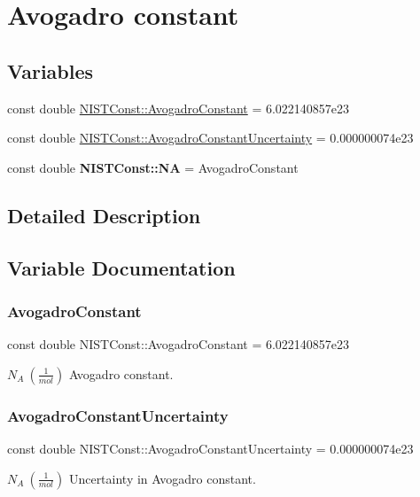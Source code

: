 \hypertarget{group___avogadro_constant}{}\section{Avogadro constant}
\label{group___avogadro_constant}
\subsection*{Variables}
\begin{DoxyCompactItemize}
\item 
const double \hyperlink{group___avogadro_constant_gad82b2a4777628c4e67a87b8f5b99174e}{N\+I\+S\+T\+Const\+::\+Avogadro\+Constant} = 6.\+022140857e23
\item 
const double \hyperlink{group___avogadro_constant_ga38f3e71e31d844bbfe2dfacf7100c4d1}{N\+I\+S\+T\+Const\+::\+Avogadro\+Constant\+Uncertainty} = 0.\+000000074e23
\item 
\mbox{\label{group___avogadro_constant_gad08af58ac1b1ee41e25bd8564a74bc42}} 
const double {\bfseries N\+I\+S\+T\+Const\+::\+NA} = Avogadro\+Constant
\end{DoxyCompactItemize}


\subsection{Detailed Description}


\subsection{Variable Documentation}
\mbox{\label{group___avogadro_constant_gad82b2a4777628c4e67a87b8f5b99174e}} 
\subsubsection{\texorpdfstring{Avogadro\+Constant}{AvogadroConstant}}
{\footnotesize\ttfamily const double N\+I\+S\+T\+Const\+::\+Avogadro\+Constant = 6.\+022140857e23}

$N_A \ (\frac{1}{mol})$ Avogadro constant. \mbox{\label{group___avogadro_constant_ga38f3e71e31d844bbfe2dfacf7100c4d1}} 
\subsubsection{\texorpdfstring{Avogadro\+Constant\+Uncertainty}{AvogadroConstantUncertainty}}
{\footnotesize\ttfamily const double N\+I\+S\+T\+Const\+::\+Avogadro\+Constant\+Uncertainty = 0.\+000000074e23}

$N_A \ (\frac{1}{mol})$ Uncertainty in Avogadro constant. 